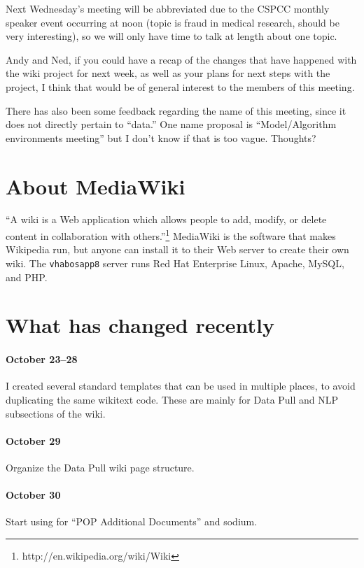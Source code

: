 \documentclass{tufte-handout}
\begin{document}
Next Wednesday's meeting will be abbreviated due to the CSPCC monthly
speaker event occurring at noon (topic is fraud in medical research,
should be very interesting), so we will only have time to talk at
length about one topic.
 
Andy and Ned, if you could have a recap of the changes that have
happened with the wiki project for next week, as well as your plans
for next steps with the project, I think that would be of general
interest to the members of this meeting.
 
There has also been some feedback regarding the name of this meeting,
since it does not directly pertain to ``data.'' One name proposal is
``Model/Algorithm environments meeting'' but I don't know if that is
too vague. Thoughts?

\section{About MediaWiki}

``A wiki is a Web application which allows people to add, modify, or
delete content in collaboration with
others.''\footnote{http://en.wikipedia.org/wiki/Wiki} MediaWiki is the
software that makes Wikipedia run, but anyone can install it to their
Web server to create their own wiki. The \texttt{vhabosapp8} server
runs Red Hat Enterprise Linux, Apache, MySQL, and PHP.

\section{What has changed recently}

\paragraph{October 23--28} I created several standard templates that
can be used in multiple places, to avoid duplicating the same wikitext
code. These are mainly for Data Pull and NLP subsections of the wiki. 

\paragraph{October 29} Organize the Data Pull wiki page structure. 

\paragraph{October 30} Start using for ``POP Additional Documents''
and sodium.
\end{document}
